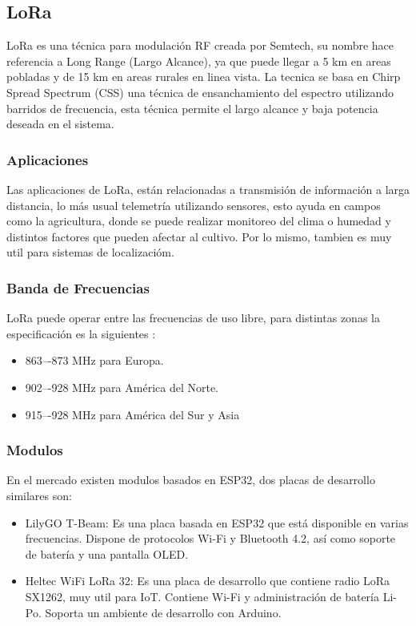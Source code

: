 \documentclass[journal]{IEEEtran}
\begin{document}
\subsection{LoRa}

LoRa es una técnica para modulación RF creada por Semtech, su nombre hace referencia a Long Range (Largo Alcance), ya que puede llegar a 5 km en areas pobladas y de 15 km en areas rurales en linea vista. La tecnica se basa en Chirp Spread Spectrum (CSS) una técnica de ensanchamiento del espectro utilizando barridos de frecuencia, esta técnica permite el largo alcance y baja potencia deseada en el sistema. \cite{semtech_lora_and_lorawan}

\subsubsection{Aplicaciones}

Las aplicaciones de LoRa, están relacionadas a transmisión de información a larga distancia, lo más usual telemetría utilizando sensores, esto ayuda en campos como la agricultura, donde se puede realizar monitoreo del clima o humedad y distintos factores que pueden afectar al cultivo. Por lo mismo, tambien es muy util para sistemas de localizacióm.

\subsubsection{Banda de Frecuencias}

LoRa puede operar entre las frecuencias de uso libre, para distintas zonas la especificación es la siguientes \cite{lora_rp002-1.0.3_2021}:

\begin{itemize}
    \item 863–-873 MHz para Europa.
    \item 902–-928 MHz para América del Norte.
    \item 915–-928 MHz para América del Sur y Asia
\end{itemize}

\subsubsection{Modulos}

En el mercado existen modulos basados en ESP32, dos placas de desarrollo similares son:

\begin{itemize}
    \item LilyGO T-Beam: Es una placa basada en ESP32 que está disponible en varias frecuencias. Dispone de protocolos Wi-Fi y Bluetooth 4.2, así como soporte de batería y una pantalla OLED. \cite{lilygo_tbeam_nodate}

    \item Heltec WiFi LoRa 32: Es una placa de desarrollo que contiene radio LoRa SX1262, muy util para IoT. Contiene Wi-Fi y administración de batería Li-Po. Soporta un ambiente de desarrollo con Arduino. \cite{heltec_wifilora32_v3_nodate}
\end{itemize}
\end{document}
